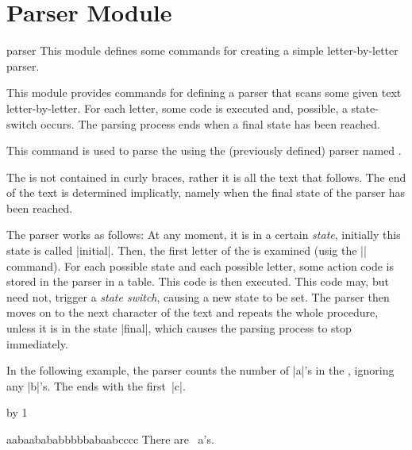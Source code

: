 %
%
%



\section{Parser Module}

\label{section-module-parser}

\begin{pgfmodule}{parser}
  This module defines some commands for creating a simple
  letter-by-letter parser.
\end{pgfmodule}

This module provides commands for defining a parser that scans some
given text letter-by-letter. For each letter, some code is executed
and, possible, a state-switch occurs. The parsing process ends when a
final state has been reached.

\begin{command}{\pgfparserparse{}}
  This command is used to parse the  using the (previously
  defined) parser named .

  The  is not contained in curly braces, rather it is all
  the text that follows. The end of the text is determined implicatly,
  namely when the final state of the parser has been reached.

  The parser works as follows: At any moment, it is in a certain
  \emph{state}, initially this state is called |initial|. Then, the
  first letter of the  is examined (usig the |\futurlet|
  command). For each possible state and each possible letter, some
  action code is stored in the parser in a table. This code is then
  executed. This code may, but need not, trigger a \emph{state
    switch}, causing a new state to be set. The parser then moves on
  to the next character of the text and repeats the whole
  procedure, unless it is in the state |final|, which causes the
  parsing process to stop immediately.

  In the following example, the parser counts the number of |a|'s
  in the , ignoring any |b|'s. The  ends with
  the first~|c|.
\begin{codeexample}[]
\newcount\mycount  
{}
{\advance\mycount by 1\relax}
{} %
{}%

aabaabababbbbbabaabcccc
There are \the\mycount\ a's.
\end{codeexample}
\end{command}

